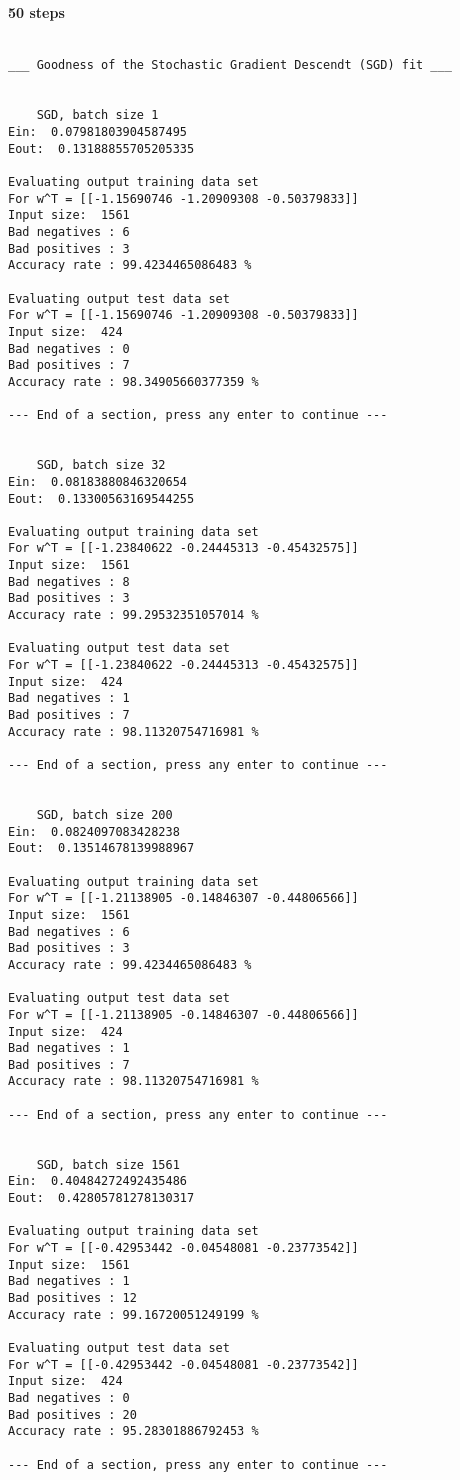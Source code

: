    \paragraph{50 steps} 
    \begin{verbatim}

___ Goodness of the Stochastic Gradient Descendt (SGD) fit ___


	SGD, batch size 1
Ein:  0.07981803904587495
Eout:  0.13188855705205335

Evaluating output training data set
For w^T = [[-1.15690746 -1.20909308 -0.50379833]]
Input size:  1561
Bad negatives : 6
Bad positives : 3
Accuracy rate : 99.4234465086483 %

Evaluating output test data set
For w^T = [[-1.15690746 -1.20909308 -0.50379833]]
Input size:  424
Bad negatives : 0
Bad positives : 7
Accuracy rate : 98.34905660377359 %

--- End of a section, press any enter to continue ---


	SGD, batch size 32
Ein:  0.08183880846320654
Eout:  0.13300563169544255

Evaluating output training data set
For w^T = [[-1.23840622 -0.24445313 -0.45432575]]
Input size:  1561
Bad negatives : 8
Bad positives : 3
Accuracy rate : 99.29532351057014 %

Evaluating output test data set
For w^T = [[-1.23840622 -0.24445313 -0.45432575]]
Input size:  424
Bad negatives : 1
Bad positives : 7
Accuracy rate : 98.11320754716981 %

--- End of a section, press any enter to continue ---


	SGD, batch size 200
Ein:  0.0824097083428238
Eout:  0.13514678139988967

Evaluating output training data set
For w^T = [[-1.21138905 -0.14846307 -0.44806566]]
Input size:  1561
Bad negatives : 6
Bad positives : 3
Accuracy rate : 99.4234465086483 %

Evaluating output test data set
For w^T = [[-1.21138905 -0.14846307 -0.44806566]]
Input size:  424
Bad negatives : 1
Bad positives : 7
Accuracy rate : 98.11320754716981 %

--- End of a section, press any enter to continue ---


	SGD, batch size 1561
Ein:  0.40484272492435486
Eout:  0.42805781278130317

Evaluating output training data set
For w^T = [[-0.42953442 -0.04548081 -0.23773542]]
Input size:  1561
Bad negatives : 1
Bad positives : 12
Accuracy rate : 99.16720051249199 %

Evaluating output test data set
For w^T = [[-0.42953442 -0.04548081 -0.23773542]]
Input size:  424
Bad negatives : 0
Bad positives : 20
Accuracy rate : 95.28301886792453 %

--- End of a section, press any enter to continue ---

\end{verbatim}

